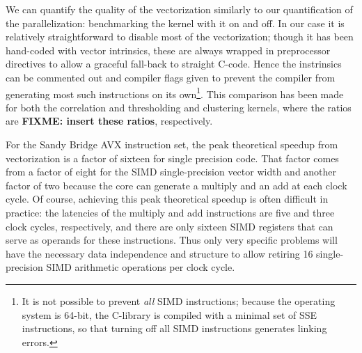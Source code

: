 \documentclass{article}
\begin{document}
We can quantify the quality of the vectorization similarly to our
quantification of the parallelization: benchmarking the kernel with it on and
off. In our case it is relatively straightforward to disable most of the
vectorization; though it has been hand-coded with vector intrinsics, these are
always wrapped in preprocessor directives to allow a graceful fall-back to
straight C-code.  Hence the instrinsics can be commented out and compiler flags
given to prevent the compiler from generating most such instructions on its
own\footnote{It is not possible to prevent \emph{all} SIMD instructions; because
  the operating system is 64-bit, the C-library is compiled with a minimal set
  of SSE instructions, so that turning off all SIMD instructions generates linking
  errors.}.
This comparison has been made for both the correlation and thresholding and
clustering kernels, where the ratios are \textbf{FIXME: insert these ratios},
respectively. 

For the Sandy Bridge AVX instruction set, the peak theoretical speedup from
vectorization is a factor of sixteen for single precision code.  That factor
comes from a factor of eight for the SIMD single-precision vector width and
another factor of two because the core can generate a multiply and an add at
each clock cycle.  Of course, achieving this peak theoretical speedup is often
difficult in practice: the latencies of the multiply and add instructions are
five and three clock cycles, respectively, and there are only sixteen SIMD
registers that can serve as operands for these instructions. Thus only very
specific problems will have the necessary data independence and structure to
allow retiring 16 single-precision SIMD arithmetic operations per clock cycle.
\end{document}
